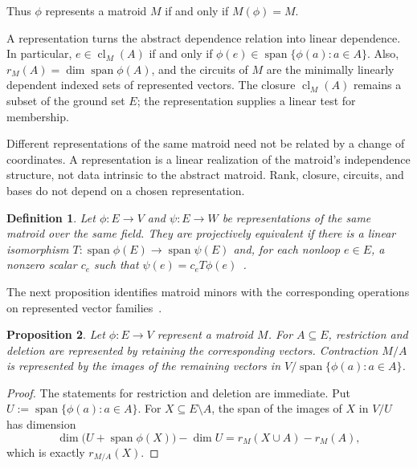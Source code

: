 \documentclass[11pt]{article}
\numberwithin{equation}{section}
\newtheorem{definition}{Definition}[section]
\newtheorem{proposition}[definition]{Proposition}
\theoremstyle{remark}
\newcommand{\cl}{\operatorname{cl}}
\begin{document}
Thus $\phi$ represents a matroid $M$ if and only if $M(\phi)=M$.

A representation turns the abstract dependence relation into linear
dependence. In particular,
$e\in\cl_M(A)$ if and only if
$\phi(e)\in\operatorname{span}\{\phi(a):a\in A\}$.
Also, $r_M(A)=\dim\operatorname{span}\phi(A)$, and the circuits of $M$ are
the minimally linearly dependent indexed sets of represented vectors. The closure $\cl_M(A)$ remains a subset of the ground set
$E$; the representation supplies a linear test for membership.

Different representations of the same matroid need not be related by a change of coordinates. A representation is a linear realization of the matroid's independence structure, not data intrinsic to the abstract matroid. Rank, closure, circuits, and bases do not depend on a chosen representation.

\begin{definition}
\label{def:projective-equivalence}
Let $\phi:E\to V$ and $\psi:E\to W$ be representations of the same matroid over the same field. They are \emph{projectively equivalent} if there is a linear isomorphism $T:\operatorname{span}\phi(E)\to\operatorname{span}\psi(E)$ and, for each nonloop $e\in E$, a nonzero scalar $c_e$ such that $\psi(e)=c_eT\phi(e)$~\cite{BrylawskiLucas1976,Oxley2011}.
\end{definition}

The next proposition identifies matroid minors with the corresponding
operations on represented vector families~\cite{Oxley2011}.

\begin{proposition}
\label{prop:represented-minors}
Let $\phi:E\to V$ represent a matroid $M$.
For $A\subseteq E$, restriction and deletion are represented by retaining the corresponding vectors. Contraction $M/A$ is represented by the images of the remaining vectors in $V/\operatorname{span}\{\phi(a):a\in A\}$.
\end{proposition}

\begin{proof}
The statements for restriction and deletion are immediate. Put
$U:=\operatorname{span}\{\phi(a):a\in A\}$. For
$X\subseteq E\setminus A$, the span of the images of $X$ in $V/U$ has
dimension
\begin{equation}
    \dim\bigl(U+\operatorname{span}\phi(X)\bigr)-\dim U
    =
    r_M(X\cup A)-r_M(A),
\end{equation}
which is exactly $r_{M/A}(X)$.
\end{proof}
\end{document}
